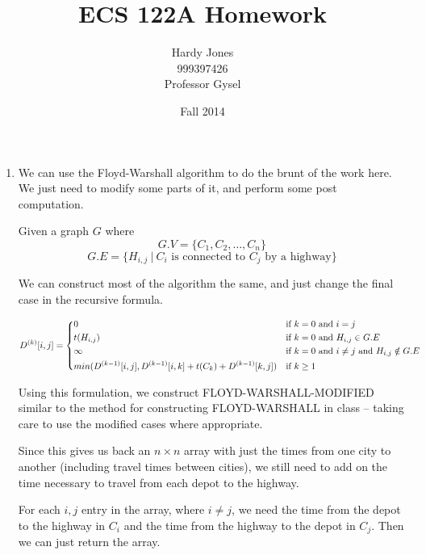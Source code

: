 \documentclass[12pt,letterpaper]{article}
\title{ECS 122A Homework \vspace{-2ex}}
\author{Hardy Jones\\
        999397426\\
        Professor Gysel\vspace{-2ex}}
\date{Fall 2014}
\begin{document}
  \maketitle

  \begin{enumerate}
    \item
      We can use the Floyd-Warshall algorithm to do the brunt of the work here.
      We just need to modify some parts of it, and perform some post computation.

      Given a graph $G$ where
      \[
        G.V = \{C_1, C_2, \dots, C_n\}
      \]
      \[
        G.E = \{H_{i, j} \ | \ C_i \text{ is connected to } C_j \text{ by a highway}\}
      \]

      We can construct most of the algorithm the same,
      and just change the final case in the recursive formula.


      \[
        D^{(k)}[i, j] =
        \begin{dcases*}
          0           & if $k = 0$ and $i = j$ \\
          t(H_{i, j}) & if $k = 0$ and $H_{i, j} \in G.E$ \\
          \infty      & if $k = 0$ and $i \ne j$ and $H_{i, j} \notin G.E$ \\
          min(D^{(k-1)}[i, j], D^{(k-1)}[i, k] + t(C_k) + D^{(k-1)}[k, j]) & if $k \ge 1$
        \end{dcases*}
      \]

      Using this formulation, we construct FLOYD-WARSHALL-MODIFIED similar to the method for constructing FLOYD-WARSHALL in class -- taking care to use the modified cases where appropriate.


      Since this gives us back an $n \times n$ array with just the times from one city to another (including travel times between cities), we still need to add on the time necessary to travel from each depot to the highway.

      For each $i, j$ entry in the array, where $i \ne j$, we need the time from the depot to the highway in $C_i$ and the time from the highway to the depot in $C_j$.
      Then we can just return the array.


\end{enumerate}
\end{document}
